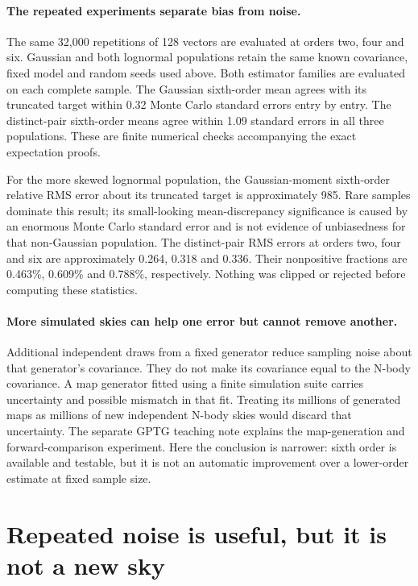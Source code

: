 \documentclass[11pt]{article}
\begin{document}
\paragraph{The repeated experiments separate bias from noise.}
The same 32,000 repetitions of 128 vectors are evaluated at orders two,
four and six. Gaussian and both lognormal populations retain the same
known covariance, fixed model and random seeds used above. Both estimator
families are evaluated on each complete sample. The Gaussian sixth-order
mean agrees with its truncated target within 0.32 Monte Carlo standard
errors entry by entry. The distinct-pair sixth-order means agree within
1.09 standard errors in all three populations. These are finite numerical
checks accompanying the exact expectation proofs.

For the more skewed lognormal population, the Gaussian-moment sixth-order
relative RMS error about its truncated target is approximately 985. Rare
samples dominate this result; its small-looking mean-discrepancy significance
is caused by an enormous Monte Carlo standard error and is not evidence of
unbiasedness for that non-Gaussian population. The distinct-pair RMS errors
at orders two, four and six are approximately 0.264, 0.318 and 0.336.
Their nonpositive fractions are 0.463\%, 0.609\% and 0.788\%, respectively.
Nothing was clipped or rejected before computing these statistics.

\paragraph{More simulated skies can help one error but cannot remove another.}
Additional independent draws from a fixed generator reduce sampling noise
about that generator's covariance. They do not make its covariance equal
to the N-body covariance. A map generator fitted using a finite simulation
suite carries uncertainty and possible mismatch in that fit. Treating its
millions of generated maps as millions of new independent N-body skies
would discard that uncertainty. The separate GPTG teaching note explains
the map-generation and forward-comparison experiment. Here the conclusion
is narrower: sixth order is available and testable, but it is not an
automatic improvement over a lower-order estimate at fixed sample size.


\FloatBarrier
\section{Repeated noise is useful, but it is not a new sky}
\end{document}
